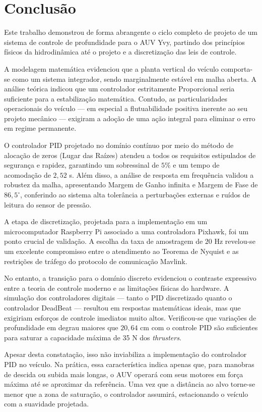 \documentclass[12pt, a4paper]{article}
\begin{document}
	\section{Conclusão}

		Este trabalho demonstrou de forma abrangente o ciclo completo de projeto de um sistema de controle de profundidade para o AUV Yvy, partindo dos princípios físicos da hidrodinâmica até o projeto e a discretização das leis de controle.

		A modelagem matemática evidenciou que a planta vertical do veículo comporta-se como um sistema integrador, sendo marginalmente estável em malha aberta. A análise teórica indicou que um controlador estritamente Proporcional seria suficiente para a estabilização matemática. Contudo, as particularidades operacionais do veículo — em especial a flutuabilidade positiva inerente ao seu projeto mecânico — exigiram a adoção de uma ação integral para eliminar o erro em regime permanente.

		O controlador PID projetado no domínio contínuo por meio do método de alocação de zeros (Lugar das Raízes) atendeu a todos os requisitos estipulados de segurança e rapidez, garantindo um sobressinal de $5\%$ e um tempo de acomodação de $2{,}52$ s. Além disso, a análise de resposta em frequência validou a robustez da malha, apresentando Margem de Ganho infinita e Margem de Fase de $86{,}5^\circ$, conferindo ao sistema alta tolerância a perturbações externas e ruídos de leitura do sensor de pressão.

		A etapa de discretização, projetada para a implementação em um microcomputador Raspberry Pi associado a uma controladora Pixhawk, foi um ponto crucial de validação. A escolha da taxa de amostragem de $20$ Hz revelou-se um excelente compromisso entre o atendimento ao Teorema de Nyquist e as restrições de tráfego do protocolo de comunicação Mavlink.

		No entanto, a transição para o domínio discreto evidenciou o contraste expressivo entre a teoria de controle moderno e as limitações físicas do hardware. A simulação dos controladores digitais — tanto o PID discretizado quanto o controlador DeadBeat — resultou em respostas matemáticas ideais, mas que exigiriam esforços de controle imediatos muito altos. Verificou-se que variações de profundidade em degrau maiores que $20{,}64$ cm com o controle PID são suficientes para saturar a capacidade máxima de 35 N dos \textit{thrusters}. 

		Apesar desta constatação, isso não inviabiliza a implementação do controlador PID no veículo. Na prática, essa característica indica apenas que, para manobras de descida ou subida mais longas, o AUV operará com seus motores em força máxima até se aproximar da referência. Uma vez que a distância ao alvo torne-se menor que a zona de saturação, o controlador assumirá, estacionando o veículo com a suavidade projetada. 
\end{document}
